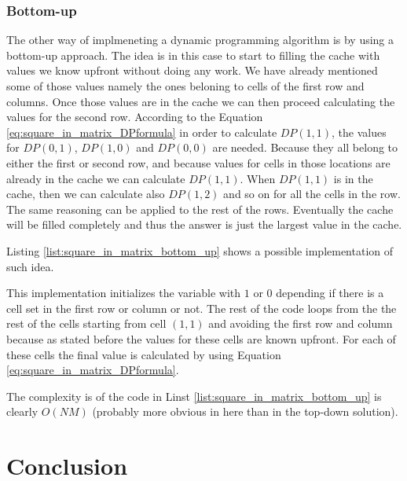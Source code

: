 \subsubsection{Bottom-up}
\label{sec:square_in_matrix:bottom-up}
The other way of implmeneting a dynamic programming algorithm is by using a
bottom-up approach. The idea is in this case to start to filling the cache with
values we know upfront without doing any work. We have already mentioned some of
those values namely the ones beloning to cells of the first row and columns.
Once those values are in the cache we can then proceed calculating the values
for the second row. According to the Equation \ref{eq:square_in_matrix_DPformula} in order to calculate
$DP(1,1)$, the values for $DP(0,1)$, $DP(1,0)$ and $DP(0,0)$ are needed. Because
they all belong to either the first or second row, and because values for cells
in those locations are already in the cache we can calculate $DP(1,1)$. When
$DP(1,1)$ is in the cache, then we can calculate also $DP(1,2)$ and so on for
all the cells in the row. The same reasoning can be applied to the rest of the
rows. Eventually the cache will be filled completely and thus the answer is just
the largest value in the cache. 

Listing \ref{list:square_in_matrix_bottom_up} shows a possible implementation of
such idea.

This implementation initializes the  variable with $1$ or $0$
depending if there is a cell set in the first row or column or not. The rest of
the code loops from the the rest of the cells starting from cell $(1,1)$ and
avoiding the first row and column because as stated before the values for these
cells are known upfront. For each of these cells the final value is calculated
by using Equation \ref{eq:square_in_matrix_DPformula}. 

The complexity is of the code in Linst \ref{list:square_in_matrix_bottom_up} is
clearly $O(NM)$ (probably more obvious in here than in the top-down solution). 


\section{Conclusion}





